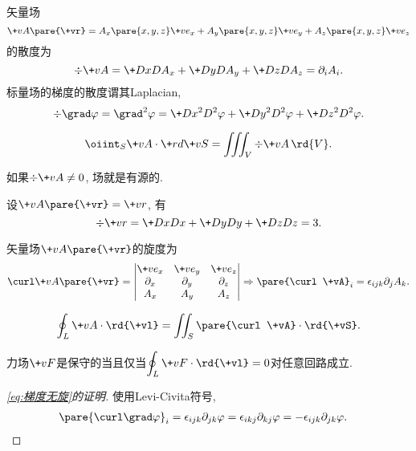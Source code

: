 \documentclass[../LectureNotes.tex]{subfiles}
\begin{document}
矢量场
\[ \+vA\pare{\+vr} = A_x\pare{x,y,z}\+ve_x + A_y\pare{x,y,z}\+ve_y + A_z\pare{x,y,z}\+ve_z \]
的散度为
\[ \div \+vA = \+DxD{A_x} + \+DyD{A_y} + \+DzD{A_z} = \partial_i A_i. \]
标量场的梯度的散度谓其Laplacian,
\[ \div\grad \varphi = \laplacian \varphi = \+D{x^2}D{^2\varphi}+\+D{y^2}D{^2\varphi}+\+D{z^2}D{^2\varphi}. \]
\begin{finale}
    \begin{theorem}
        \[ \oiint_S \+vA\cdot\+rd{\+vS} = \iiint_V \div\+vA \,\rd{V}. \]
    \end{theorem}
\end{finale}
\begin{remark}
    如果$\div\+vA\neq 0$, 场就是有源的.
\end{remark}
\begin{sample}
    \begin{ex}
        设$\+vA\pare{\+vr} = \+vr$, 有
        \[ \div\+vr = \+DxDx + \+DyDy + \+DzDz = 3. \]
    \end{ex}
\end{sample}
矢量场$\+vA\pare{\+vr}$的旋度为
\[ \curl \+vA\pare{\+vr} = \begin{vmatrix}
    \+ve_x & \+ve_y & \+ve_z \\
    \partial_x & \partial_y & \partial_z \\
    A_x & A_y & A_z
\end{vmatrix} \Rightarrow \pare{\curl\+vA}_i = \epsilon_{ijk}\partial_j A_k. \]
\begin{finale}
    \begin{theorem}[Stokes定理]
        \[ \oint_L \+vA\cdot\rd{\+vl} = \iint_S \pare{\curl\+vA}\cdot\rd{\+vS}. \]
    \end{theorem}
\end{finale}
\begin{remark}
    力场$\+vF$是保守的当且仅当$\displaystyle\oint_L \+vF\cdot\rd{\+vl} = 0$对任意回路成立.
\end{remark}
\begin{proof}[\eqref{eq:梯度无旋}的证明]
    使用Levi-Civita符号,
    \begin{align*}
        \pare{\curl\grad\varphi}_i &= \epsilon_{ijk}\partial_{jk}\varphi = \epsilon_{ikj}\partial_{kj}\varphi = -\epsilon_{ijk}\partial_{jk}\varphi. \qedhere
    \end{align*}
\end{proof}
\end{document}
